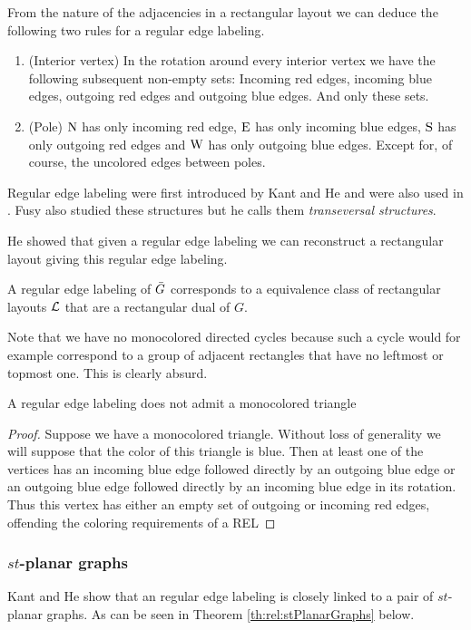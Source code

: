   From the nature of the adjacencies in a rectangular layout we can deduce the following two rules for a regular edge labeling.
  \begin{enumerate}
    \item (Interior vertex) In the rotation around every interior vertex we have the following subsequent non-empty sets: Incoming red edges, incoming blue edges, outgoing red edges and outgoing blue edges. And only these sets.
    \item (Pole) $\mathrm{N}$ has only incoming red edge, $\mathrm{E}$ has only incoming blue edges, $\mathrm{S}$ has only outgoing red edges and $\mathrm{W}$ has only outgoing blue edges. Except for, of course, the uncolored edges between poles.
  \end{enumerate}

  Regular edge labeling were first introduced by Kant and He \cite{Kant1997} and were also used in \cite{Eppstein2012}. Fusy also studied these structures \cite{Fusy2006,Fusy2009} but he calls them \emph{transeversal structures}.

  He showed \cite{He1993} that given a regular edge labeling we can reconstruct a rectangular layout giving this regular edge labeling.

  A regular edge labeling  of $\bar{G}$ corresponds to a equivalence class of rectangular layouts $\mathcal{L}$ that are a rectangular dual of $G$.

  Note that we have no monocolored directed cycles because such a cycle would for example correspond to a  group of adjacent rectangles that have  no leftmost or topmost one. This is clearly absurd.

  \begin{lemma}
    \label{lm:rel:noMonoColoredTriangles}
    A regular edge labeling does not admit a monocolored triangle
  \end{lemma}

  \begin{proof}
    Suppose we have a monocolored triangle. Without loss of generality we will suppose that the color of this triangle is blue. Then at least one of the vertices has an incoming blue edge followed directly by an outgoing blue edge or an outgoing blue edge followed directly by an incoming blue edge in its rotation. Thus this vertex has either an empty set of outgoing or incoming red edges, offending the coloring requirements of a REL
  \end{proof}

  \subsubsection{$st$-planar graphs}
    Kant and He \cite[pp.179]{Kant1997} show that an regular edge labeling is closely linked to a pair of $st$-planar graphs. As can be seen in Theorem \ref{th:rel:stPlanarGraphs} below.


